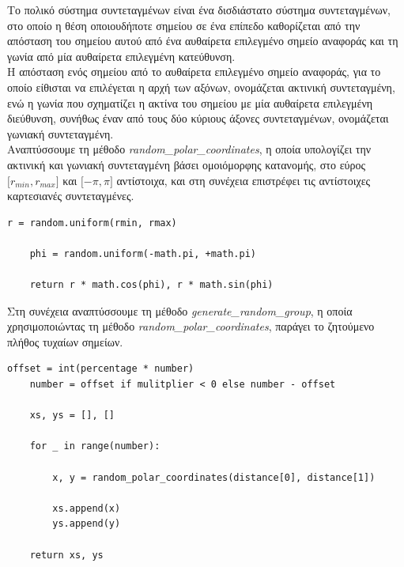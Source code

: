 \documentclass[12pt]{article}
\begin{document}
Tο πολικό σύστημα συντεταγμένων είναι ένα δισδιάστατο σύστημα συντεταγμένων,
στο οποίο η θέση οποιουδήποτε σημείου σε ένα επίπεδο καθορίζεται από την απόσταση του σημείου αυτού
από ένα αυθαίρετα επιλεγμένο σημείο αναφοράς και τη γωνία από μία αυθαίρετα επιλεγμένη κατεύθυνση. \\

Η απόσταση ενός σημείου από το αυθαίρετα επιλεγμένο σημείο αναφοράς,
για το οποίο είθισται να επιλέγεται η αρχή των αξόνων,
ονομάζεται ακτινική συντεταγμένη, ενώ η γωνία που σχηματίζει η ακτίνα του σημείου
με μία αυθαίρετα επιλεγμένη διεύθυνση, συνήθως έναν από τους δύο κύριους άξονες συντεταγμένων,
ονομάζεται γωνιακή συντεταγμένη. \\

Αναπτύσσουμε τη μέθοδο \textit{random\_polar\_coordinates},
η οποία υπολογίζει την ακτινική και γωνιακή συντεταγμένη βάσει ομοιόμορφης κατανομής,
στο εύρος \( \lbrack r_{min}, r_{max} \rbrack \) και \( \lbrack -\pi, \pi \rbrack \)
αντίστοιχα, και στη συνέχεια επιστρέφει τις αντίστοιχες καρτεσιανές συντεταγμένες. \\

\begin{lstlisting}[caption={Η μέθοδος \textit{random\_polar\_coordinates}}]
    r = random.uniform(rmin, rmax)

    phi = random.uniform(-math.pi, +math.pi)

    return r * math.cos(phi), r * math.sin(phi)
\end{lstlisting}

Στη συνέχεια αναπτύσσουμε τη μέθοδο \textit{generate\_random\_group},
η οποία χρησιμοποιώντας τη μέθοδο \textit{random\_polar\_coordinates},
παράγει το ζητούμενο πλήθος τυχαίων σημείων. \\

\begin{lstlisting}[caption={Η μέθοδος \textit{generate\_random\_group}}]
    offset = int(percentage * number)
    number = offset if mulitplier < 0 else number - offset

    xs, ys = [], []

    for _ in range(number):

        x, y = random_polar_coordinates(distance[0], distance[1])

        xs.append(x)
        ys.append(y)

    return xs, ys
\end{lstlisting}

\pagebreak
\end{document}
